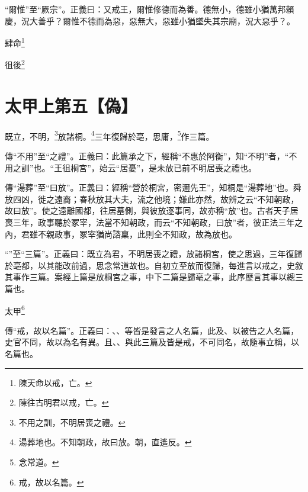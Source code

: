 {\noindent\shu{}\fzkt “爾惟”至“厥宗”。正義曰：又戒王，爾惟修德而為善。德無小，德雖小猶萬邦賴慶，況大善乎？爾惟不德而為惡，惡無大，惡雖小猶墜失其宗廟，況大惡乎？。 \par}

肆命\footnote{陳天命以戒，亡。}

徂後\footnote{陳往古明君以戒，亡。}

\section{太甲上第五【偽】}


既立，不明，\footnote{不用之訓，不明居喪之禮。}放諸桐。\footnote{湯葬地也。不知朝政，故曰放。朝，直遙反。}三年復歸於亳，思庸，\footnote{念常道。}作三篇。


{\noindent\zhuan{}\fzbyks 傳“不用”至“之禮”。正義曰：此篇承之下，經稱“不惠於阿衡”，知“不明”者，“不用之訓”也。“王徂桐宮”，始云“居憂”，是未放已前不明居喪之禮也。 \par}

{\noindent\zhuan{}\fzbyks 傳“湯葬”至“曰放”。正義曰：經稱“營於桐宮，密邇先王”，知桐是“湯葬地”也。舜放四凶，徙之遠裔；春秋放其大夫，流之他境；嫌此亦然，故辨之云“不知朝政，故曰放”。使之遠離國都，往居墓側，與彼放逐事同，故亦稱“放”也。古者天子居喪三年，政事聽於冢宰，法當不知朝政，而云“不知朝政，曰放”者，彼正法三年之內，君雖不親政事，冢宰猶尚諮稟，此則全不知政，故為放也。 \par}

{\noindent\shu{}\fzkt “”至“三篇”。正義曰：既立為君，不明居喪之禮，放諸桐宮，使之思過，三年復歸於亳都，以其能改前過，思念常道故也。自初立至放而復歸，每進言以戒之，史敘其事作三篇。案經上篇是放桐宮之事，中下二篇是歸亳之事，此序歷言其事以總三篇也。 \par}

太甲\footnote{戒，故以名篇。}

{\noindent\zhuan{}\fzbyks 傳“戒，故以名篇”。正義曰：、、等皆是發言之人名篇，此及、以被告之人名篇，史官不同，故以為名有異。且、、與此三篇及皆是戒，不可同名，故隨事立稱，以名篇也。 \par}

